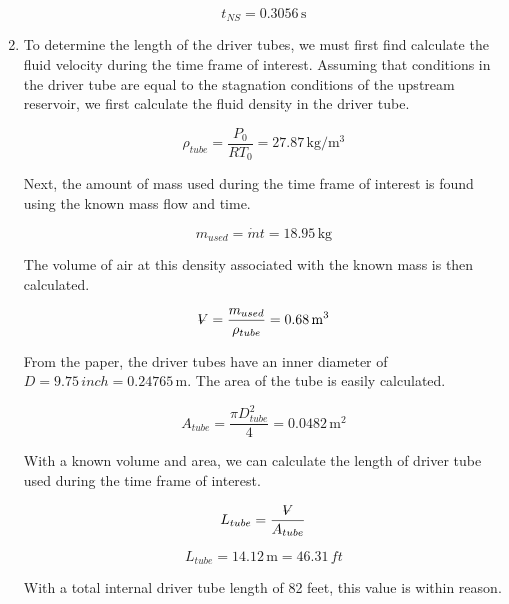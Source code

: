 \documentclass[../main.tex]{subfiles}
\begin{document}
\begin{enumerate}[label=(\alph*)]
    \[
        \boxed{t_{NS} = 0.3056\,\unit{\second}}
    \]

    \item To determine the length of the driver tubes, we must first find calculate the fluid velocity during the time frame of interest.
    Assuming that conditions in the driver tube are equal to the stagnation conditions of the upstream reservoir, we first calculate the fluid density in the driver tube.

    \[
        \rho_{tube} = \frac{P_0}{RT_0} = 27.87 \, \unit{\kilogram/\meter\cubed}
    \]

    Next, the amount of mass used during the time frame of interest is found using the known mass flow and time.

    \[
        m_{used} = \dot{m} t = 18.95 \, \unit{\kilogram}  
    \]

    The volume of air at this density associated with the known mass is then calculated.

    \[
        \volume = \frac{m_{used}}{\rho_{tube}} = 0.68 \, \unit{\meter\cubed}
    \]

    From the paper, the driver tubes have an inner diameter of \(D=9.75\,\unit{inch}=0.24765\,\unit{\meter}\).
    The area of the tube is easily calculated.

    \[
        A_{tube} = \frac{\pi D_{tube}^2}{4} = 0.0482 \, \unit{\meter\squared}  
    \]

    With a known volume and area, we can calculate the length of driver tube used during the time frame of interest.

    \[
        L_{tube} = \frac{\volume}{A_{tube}}  
    \]

    \[
        \boxed{L_{tube} = 14.12 \, \unit{\meter} = 46.31 \, \unit{ft}}
    \]

    With a total internal driver tube length of 82 feet, this value is within reason.

\end{enumerate}
\end{document}

